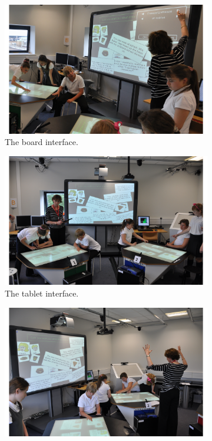 \documentclass[link]{IWCOMP}
\begin{document}
\begin{figure}[t]
	\centering
	\begin{subfigure}[t]{0.3\textwidth}
		\centering
		\includegraphics[width=\textwidth]{figures/study_board.png}
		\caption{The board interface.}
		\label{fig:studyBoard}
	\end{subfigure}
	\begin{subfigure}[t]{0.3\textwidth}
		\centering
		\includegraphics[width=\textwidth]{figures/study_tablet.png}
		\caption{The tablet interface.}
		\label{fig:studyTablet}
	\end{subfigure}
	\begin{subfigure}[t]{0.3\textwidth}
		\centering
		\includegraphics[width=\textwidth]{figures/study_kinect.png}

\end{subfigure}
\end{figure}
\end{document}
